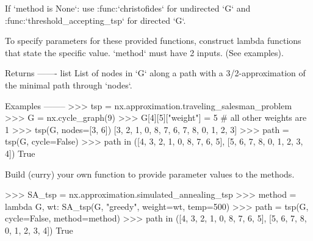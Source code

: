 \begin{DoxyVerb}
    If `method is None`: use :func:`christofides` for undirected `G` and
    :func:`threshold_accepting_tsp` for directed `G`.

    To specify parameters for these provided functions, construct lambda
    functions that state the specific value. `method` must have 2 inputs.
    (See examples).

Returns
-------
list
    List of nodes in `G` along a path with a 3/2-approximation of the minimal
    path through `nodes`.

Examples
--------
>>> tsp = nx.approximation.traveling_salesman_problem
>>> G = nx.cycle_graph(9)
>>> G[4][5]["weight"] = 5  # all other weights are 1
>>> tsp(G, nodes=[3, 6])
[3, 2, 1, 0, 8, 7, 6, 7, 8, 0, 1, 2, 3]
>>> path = tsp(G, cycle=False)
>>> path in ([4, 3, 2, 1, 0, 8, 7, 6, 5], [5, 6, 7, 8, 0, 1, 2, 3, 4])
True

Build (curry) your own function to provide parameter values to the methods.

>>> SA_tsp = nx.approximation.simulated_annealing_tsp
>>> method = lambda G, wt: SA_tsp(G, "greedy", weight=wt, temp=500)
>>> path = tsp(G, cycle=False, method=method)
>>> path in ([4, 3, 2, 1, 0, 8, 7, 6, 5], [5, 6, 7, 8, 0, 1, 2, 3, 4])
True\end{DoxyVerb}
 